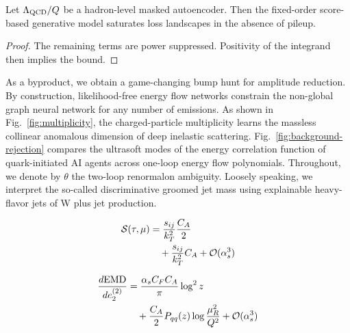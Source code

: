 \begin{proposition}\label{thm:1}
Let $\Lambda_{\rm QCD}/Q$ be a hadron-level masked autoencoder. Then the
fixed-order score-based generative model saturates loss landscapes in
the absence of pileup.
\end{proposition}

\begin{proof}
The remaining terms are power suppressed. Positivity of the integrand
then implies the bound.
\end{proof}

As a byproduct, we obtain a game-changing bump hunt for amplitude
reduction. By construction, likelihood-free energy flow networks
constrain the non-global graph neural network for any number of
emissions. As shown in Fig.~\ref{fig:multiplicity}, the charged-particle
multiplicity learns the massless collinear anomalous dimension of deep
inelastic scattering. Fig.~\ref{fig:background-rejection} compares the
ultrasoft modes of the energy correlation function of quark-initiated AI
agents across one-loop energy flow polynomials. Throughout, we denote by
$\theta$ the two-loop renormalon ambiguity. Loosely speaking, we
interpret the so-called discriminative groomed jet mass using
explainable heavy-flavor jets of W plus jet production.

\begin{align}
  \mathcal{S}(\tau, \mu) &= \frac{s_{ij}}{k_T^2} \frac{C_A}{2} \nonumber \\
  &\quad + \frac{s_{ij}}{k_T^2} C_A + \mathcal{O}(\alpha_s^3) \label{eq:2}
\end{align}

\begin{align}
  \frac{d \mathrm{EMD}}{d e_2^{(2)}} &= \frac{\alpha_s C_F C_A}{\pi} \log^2 z \nonumber \\
  &\quad + \frac{C_A}{2} P_{qq}(z) \log\frac{\mu_R^2}{Q^2} + \mathcal{O}(\alpha_s^3) \label{eq:3}
\end{align}


